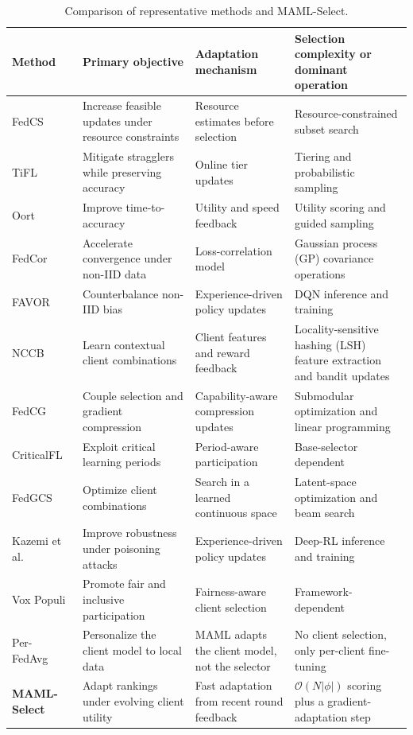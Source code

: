 \documentclass[journal]{IEEEtran}
\theoremstyle{remark}
\begin{document}
\begin{table}[!t]
    \color{black}
    \caption{Comparison of representative methods and MAML-Select.}
    \label{tab:related_work_comparison}
    \centering
    \scriptsize
    \setlength{\tabcolsep}{3pt}
    \renewcommand{\arraystretch}{0.98}
    \begin{tabularx}{\textwidth}{lXXX}
        \toprule
        \textbf{Method} & \textbf{Primary objective} & \textbf{Adaptation mechanism} & \textbf{Selection complexity or dominant operation} \\
        \midrule
        FedCS~\cite{nishio2019client} & Increase feasible updates under resource constraints & Resource estimates before selection & Resource-constrained subset search \\
        TiFL~\cite{chai2020tifl} & Mitigate stragglers while preserving accuracy & Online tier updates & Tiering and probabilistic sampling \\
        Oort~\cite{lai2021oort} & Improve time-to-accuracy & Utility and speed feedback & Utility scoring and guided sampling \\
        FedCor~\cite{tang2022fedcor} & Accelerate convergence under non-IID data & Loss-correlation model & Gaussian process (GP) covariance operations \\
        FAVOR~\cite{wang2020optimizing} & Counterbalance non-IID bias & Experience-driven policy updates & DQN inference and training \\
        NCCB~\cite{pan2024contextual} & Learn contextual client combinations & Client features and reward feedback & Locality-sensitive hashing (LSH) feature extraction and bandit updates \\
        FedCG~\cite{xu2024federated} & Couple selection and gradient compression & Capability-aware compression updates & Submodular optimization and linear programming \\
        CriticalFL~\cite{yan2023criticalfl} & Exploit critical learning periods & Period-aware participation & Base-selector dependent \\
        FedGCS~\cite{ning2024fedgcs} & Optimize client combinations & Search in a learned continuous space & Latent-space optimization and beam search \\
        Kazemi et al.~\cite{kazemi2026robust} & Improve robustness under poisoning attacks & Experience-driven policy updates & Deep-RL inference and training \\
        Vox Populi~\cite{arisdakessian2026vox} & Promote fair and inclusive participation & Fairness-aware client selection & Framework-dependent \\
        Per-FedAvg~\cite{fallah2020personalized} & Personalize the client model to local data & MAML adapts the client model, not the selector & No client selection, only per-client fine-tuning \\
        \textbf{MAML-Select} & Adapt rankings under evolving client utility & Fast adaptation from recent round feedback & $\mathcal{O}(N|\phi|)$ scoring plus a gradient-adaptation step \\
        \bottomrule
    \end{tabularx}
\end{table}
\end{document}
